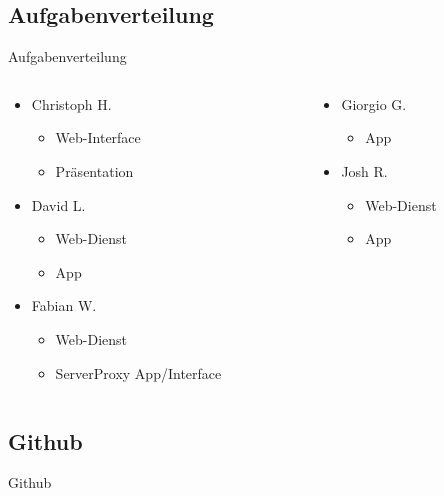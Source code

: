 \documentclass[19pt]{beamer}
\begin{document}
\subsection{Aufgabenverteilung}
\begin{frame}{Aufgabenverteilung}
  \begin{columns}[T]
    \begin{column}{.5\textwidth}
    		\begin{itemize}
    	\item Christoph H.
			\begin{itemize}
				\item Web-Interface
				\item Präsentation
			\end{itemize}
		\item David L.
			\begin{itemize}
				\item Web-Dienst
				\item App
			\end{itemize}
		\item Fabian W.
			\begin{itemize}
				\item Web-Dienst
				\item ServerProxy App/Interface
			\end{itemize}
    		\end{itemize}
    \end{column}
    \begin{column}{.5\textwidth}
    \begin{itemize}
		\item Giorgio G.
			\begin{itemize}
				\item App
			\end{itemize}
		\item Josh R.
			\begin{itemize}
				\item Web-Dienst
				\item App
			\end{itemize}
	\end{itemize}
    \end{column}
  \end{columns}
\end{frame}

\subsection{Github}
\begin{frame}{Github}
\end{frame}
\end{document}
